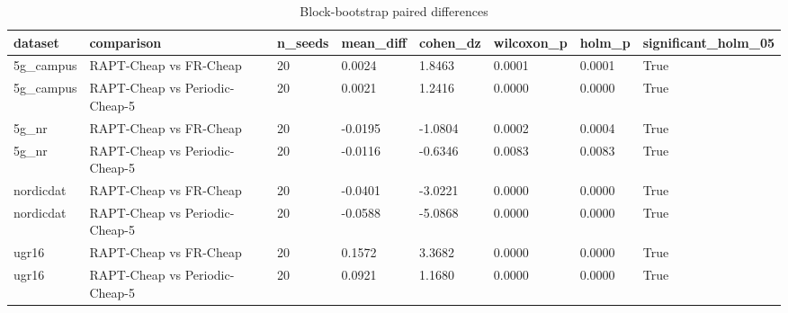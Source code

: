 \begin{table}[t]
\centering
\caption{Block-bootstrap paired differences}
\label{tab:t5b}
\begin{tabular}{llllllll}
\toprule
dataset & comparison & n\_seeds & mean\_diff & cohen\_dz & wilcoxon\_p & holm\_p & significant\_holm\_05 \\
\midrule
5g\_campus & RAPT-Cheap vs FR-Cheap & 20 & 0.0024 & 1.8463 & 0.0001 & 0.0001 & True \\
5g\_campus & RAPT-Cheap vs Periodic-Cheap-5 & 20 & 0.0021 & 1.2416 & 0.0000 & 0.0000 & True \\
5g\_nr & RAPT-Cheap vs FR-Cheap & 20 & -0.0195 & -1.0804 & 0.0002 & 0.0004 & True \\
5g\_nr & RAPT-Cheap vs Periodic-Cheap-5 & 20 & -0.0116 & -0.6346 & 0.0083 & 0.0083 & True \\
nordicdat & RAPT-Cheap vs FR-Cheap & 20 & -0.0401 & -3.0221 & 0.0000 & 0.0000 & True \\
nordicdat & RAPT-Cheap vs Periodic-Cheap-5 & 20 & -0.0588 & -5.0868 & 0.0000 & 0.0000 & True \\
ugr16 & RAPT-Cheap vs FR-Cheap & 20 & 0.1572 & 3.3682 & 0.0000 & 0.0000 & True \\
ugr16 & RAPT-Cheap vs Periodic-Cheap-5 & 20 & 0.0921 & 1.1680 & 0.0000 & 0.0000 & True \\
\bottomrule
\end{tabular}
\end{table}
